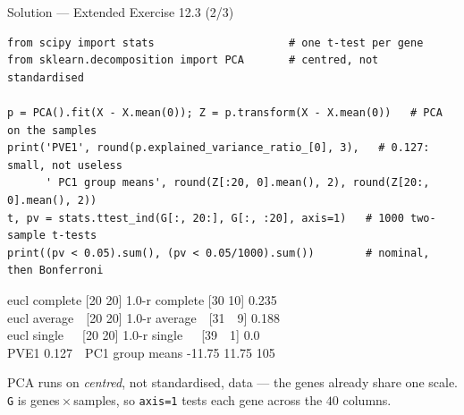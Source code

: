 \documentclass[aspectratio=169,11pt]{beamer}
\begin{document}
\begin{frame}[fragile]{Solution --- Extended Exercise 12.3 (2/3)}
  \footnotesize
\begin{solutionbox}
\begin{lstlisting}[basicstyle=\ttfamily\scriptsize]
from scipy import stats                     # one t-test per gene
from sklearn.decomposition import PCA       # centred, not standardised

p = PCA().fit(X - X.mean(0)); Z = p.transform(X - X.mean(0))   # PCA on the samples
print('PVE1', round(p.explained_variance_ratio_[0], 3),   # 0.127: small, not useless
      ' PC1 group means', round(Z[:20, 0].mean(), 2), round(Z[20:, 0].mean(), 2))
t, pv = stats.ttest_ind(G[:, 20:], G[:, :20], axis=1)   # 1000 two-sample t-tests
print((pv < 0.05).sum(), (pv < 0.05/1000).sum())        # nominal, then Bonferroni
\end{lstlisting}
  \begin{center}\ttfamily\scriptsize
  eucl complete [20 20] 1.0-r complete [30 10] 0.235\\
  eucl average\ \ [20 20] 1.0-r average\ \ [31\ \ 9] 0.188\\
  eucl single\ \ \ [20 20] 1.0-r single\ \ \ [39\ \ 1] 0.0\\[2pt]
  PVE1 0.127\ \ PC1 group means -11.75 11.75 105
  \end{center}
\end{solutionbox}
\vspace{-8pt}
\begin{readme}
  PCA runs on \emph{centred}, not standardised, data --- the genes already share one
  scale. \texttt{G} is genes\,$\times$\,samples, so \texttt{axis=1} tests each gene across
  the $40$ columns.
\end{readme}
\end{frame}
\end{document}
